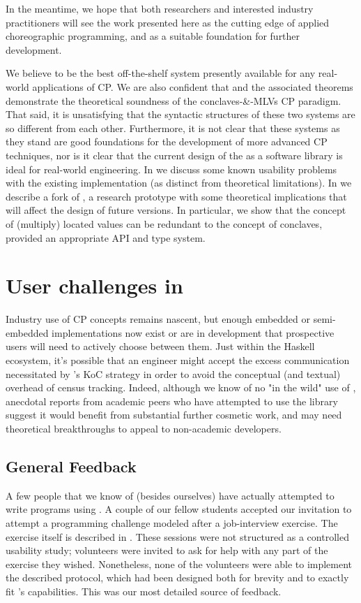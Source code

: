 In the meantime, we hope that both researchers and interested industry practitioners
will see the work presented here as the cutting edge of applied choreographic programming,
and as a suitable foundation for further development.

We believe \MultiChor to be the best off-the-shelf system presently available for any real-world applications of CP.
We are also confident that \HLSCentral and the associated theorems demonstrate the theoretical soundness of the conclaves-\&-MLVs
CP paradigm.
That said, it is unsatisfying that the syntactic structures of these two systems are so different from each other.
Furthermore, it is not clear that these systems as they stand are good foundations for the development of more advanced CP techniques,
nor is it clear that the current design of the \MultiChor as a software library is ideal for real-world engineering.
In  we discuss some known usability problems with the existing \MultiChor implementation
(as distinct from theoretical limitations).
In  we describe a fork of \MultiChor, a research prototype with some theoretical implications that will affect
the design of future \MultiChor versions.
In particular, we show that the concept of (multiply) located values can be redundant to the concept of conclaves,
provided an appropriate API and type system.

\section{User challenges in \MultiChor}

Industry use of CP concepts remains nascent,
but enough embedded or semi-embedded implementations now exist or are in development that prospective users
will need to actively choose between them.
Just within the Haskell ecosystem, it's possible that an engineer might accept the excess communication necessitated by \HasChor's
KoC strategy in order to avoid the conceptual (and textual) overhead of census tracking.
Indeed, although we know of no "in the wild" use of \MultiChor,
anecdotal reports from academic peers who have attempted to use the library suggest it would benefit from substantial further cosmetic work,
and may need theoretical breakthroughs to appeal to non-academic developers.

\subsection{General Feedback}
\label{sec:usability-sources}
A few people that we know of (besides ourselves) have actually attempted to write programs using \MultiChor.
A couple of our fellow students accepted our invitation to attempt a programming challenge modeled after a job-interview exercise.
The exercise itself is described in .
These sessions were not structured as a controlled usability study;
volunteers were invited to ask for help with any part of the exercise they wished.
Nonetheless, none of the volunteers were able to implement the described protocol,
which had been designed both for brevity and to exactly fit \MultiChor's capabilities.
This was our most detailed source of feedback.

